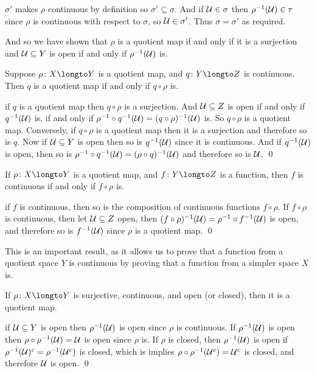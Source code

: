 $\sigma'$ makes $\rho$ continuous by definition so $\sigma'\subseteq\sigma$.
And if ${\cal U}\in\sigma$ then $\rho^{-1}({\cal U})\in\tau$ since $\rho$ is continuous with respect to $\sigma$, so ${\cal U}\in\sigma'$.
Thus $\sigma=\sigma'$ as required.

And so we have shown that $\rho$ is a quotient map if and only if it is a surjection and ${\cal U}\subseteq Y$ is open if and only if $\rho^{-1}({\cal U})$ is.

\bprop

    Suppose $\rho\colon X\longto Y$ is a quotient map, and $q\colon Y\longto Z$ is continuous.
    Then $q$ is a quotient map if and only if $q\circ\rho$ is.

\eprop

\Proof if $q$ is a quotient map then $q\circ\rho$ is a surjection.
And ${\cal U}\subseteq Z$ is open if and only if $q^{-1}({\cal U})$ is, if and only if $\rho^{-1}\circ q^{-1}({\cal U})=(q\circ\rho)^{-1}({\cal U})$ is.
So $q\circ\rho$ is a quotient map.
Conversely, if $q\circ\rho$ is a quotient map then it is a surjection and therefore so is $q$.
Now if ${\cal U}\subseteq Y$ is open then so is $q^{-1}({\cal U})$ since it is continuous.
And if $q^{-1}({\cal U})$ is open, then so is $\rho^{-1}\circ q^{-1}({\cal U})=(\rho\circ q)^{-1}({\cal U})$ and therefore so is ${\cal U}$.
\qed

\bprop

    If $\rho\colon X\longto Y$ is a quotient map, and $f\colon Y\longto Z$ is a function, then $f$ is continuous if and only if $f\circ\rho$ is.

\eprop

\Proof if $f$ is continuous, then so is the composition of continuous functions $f\circ\rho$.
If $f\circ\rho$ is continuous, then let ${\cal U}\subseteq Z$ open, then $(f\circ\rho)^{-1}({\cal U})=\rho^{-1}\circ f^{-1}({\cal U})$ is open, and therefore so is $f^{-1}({\cal U})$ since $\rho$ is a quotient map.
\qed

This is an important result, as it allows us to prove that a function from a quotient space $Y$ is continuous by proving that a function from a simpler space $X$ is.

\bprop

    If $\rho\colon X\longto Y$ is surjective, continuous, and open (or closed), then it is a quotient map.

\eprop

\Proof if ${\cal U}\subseteq Y$ is open then $\rho^{-1}({\cal U})$ is open since $\rho$ is continuous.
If $\rho^{-1}({\cal U})$ is open then $\rho\circ\rho^{-1}({\cal U})={\cal U}$ is open since $\rho$ is.
If $\rho$ is closed, then $\rho^{-1}({\cal U})$ is open if $\rho^{-1}({\cal U})^c=\rho^{-1}({\cal U}^c)$ is closed, which is implies $\rho\circ\rho^{-1}({\cal U}^c)={\cal U}^c$ is closed, and therefore ${\cal U}$ is open.
\qed

